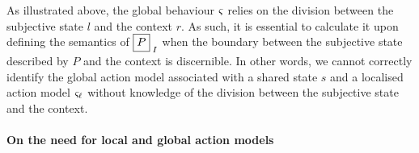 As illustrated above, the global behaviour $\varsigma_{}$ relies on the division between the subjective state $l$ and the context $r$. As such, it is essential to calculate it upon defining the semantics of $\shared{P}{I}$ when the boundary between the subjective state described by $P$ and the context is discernible.  In other words, we cannot correctly identify the global action model associated with  a shared state $s$ and a localised action model $\varsigma_{\ell}$ without knowledge of the division between the subjective state and the context. 






\paragraph{On the need for local and global action models}
\label{subsec:localGlobalActionModels}


